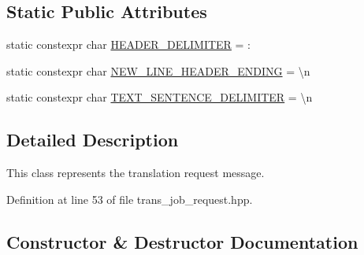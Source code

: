 \subsection*{Static Public Attributes}
\begin{DoxyCompactItemize}
\item 
static constexpr char \hyperlink{classuva_1_1smt_1_1bpbd_1_1common_1_1messaging_1_1trans__job__request_a821655aac18f2af6fe102c3b2b0691db}{H\+E\+A\+D\+E\+R\+\_\+\+D\+E\+L\+I\+M\+I\+T\+E\+R} = \textquotesingle{}\+:\textquotesingle{}
\item 
static constexpr char \hyperlink{classuva_1_1smt_1_1bpbd_1_1common_1_1messaging_1_1trans__job__request_a846150d7c462d88a53470ee80499785d}{N\+E\+W\+\_\+\+L\+I\+N\+E\+\_\+\+H\+E\+A\+D\+E\+R\+\_\+\+E\+N\+D\+I\+N\+G} = \textquotesingle{}\textbackslash{}n\textquotesingle{}
\item 
static constexpr char \hyperlink{classuva_1_1smt_1_1bpbd_1_1common_1_1messaging_1_1trans__job__request_a41d1c11ff3140a1688929f8605551e6e}{T\+E\+X\+T\+\_\+\+S\+E\+N\+T\+E\+N\+C\+E\+\_\+\+D\+E\+L\+I\+M\+I\+T\+E\+R} = \textquotesingle{}\textbackslash{}n\textquotesingle{}
\end{DoxyCompactItemize}


\subsection{Detailed Description}
This class represents the translation request message. 

Definition at line 53 of file trans\+\_\+job\+\_\+request.\+hpp.



\subsection{Constructor \& Destructor Documentation}
\hypertarget{classuva_1_1smt_1_1bpbd_1_1common_1_1messaging_1_1trans__job__request_a1716fdfe0aff7aa3b613860995f3ad01}{}
